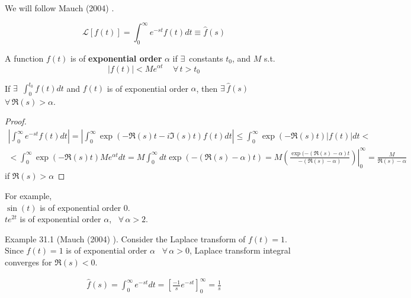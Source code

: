 We will follow Mauch (2004) \cite{agat:Mauc2004}.

\begin{definition}
\begin{equation}
\mathcal{L}[f(t)] = \int_0^{\infty} e^{-st} f(t) dt \equiv \widehat{f}(s)
\end{equation}
\end{definition}

\begin{definition}
A function $f(t)$ is of \textbf{exponential order} $\alpha$ if $\exists \, $ constants $t_0$, and $M$ s.t.
\begin{equation}
|f(t) | < M e^{\alpha t} \quad \, \forall \, t > t_0
\end{equation}
\end{definition}

If $\exists \, $ $\int_0^{t_0} f(t) dt$ and $f(t)$ is of exponential order $\alpha$, then $\exists \, \widehat{f}(s)$ \, $\forall \, \Re{(s)} > \alpha$.

\begin{proof}
\[
\begin{gathered}
| \int_0^{\infty} e^{-st} f(t) dt | = | \int_0^{\infty} \exp{ (-\Re{(s)} t - i \Im{ (s)} t )} f(t) dt | \leq \int_0^{\infty} \exp{( -\Re{(s)} t)} |f(t)| dt < \\
< \int_0^{\infty} \exp{ (- \Re{(s)} t) } Me^{\alpha t} dt   = M \int_0^{\infty} dt \exp{ (- (\Re{ (s)} - \alpha ) t ) } = M \left. \left( \frac{ \exp{ (- (\Re{ (s)} - \alpha ) t} }{ - (\Re{ (s)} - \alpha ) } \right) \right|_0^{\infty} = \frac{M }{ \Re{ (s) } - \alpha }
\end{gathered}
\]
if $\Re{(s)} > \alpha$
\end{proof}

For example, \\
$\sin{(t)}$ is of exponential order 0. \\
$te^{2t}$ is of exponential order $\alpha$, \, $\forall \, \alpha >2$.

Example 31.1 (Mauch (2004) \cite{agat:Mauc2004}). Consider the Laplace transform of $f(t) = 1$.  Since $f(t)= 1$ is of exponential order $\alpha $ \, $\forall \, \alpha >0$, Laplace transform integral converges for $\Re{(s)} < 0$.

\[
\begin{gathered}
\widehat{f}(s) = \int_0^{\infty} e^{-st} dt = \left[ \frac{-1}{s} e^{-st} \right]_0^{\infty} = \frac{1}{s}
\end{gathered}
\]

